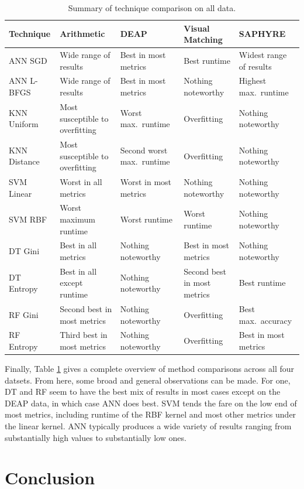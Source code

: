 \documentclass[12pt]{uthesis-v12}  %
\begin{document}
\begin{table}[!t]
\caption{Summary of technique comparison on all data.}
\renewcommand{\arraystretch}{1.3}
\centering
\resizebox{\textwidth}{!}
{\begin{tabular}{*{5}{l}}
\toprule
Technique & Arithmetic & DEAP & Visual Matching & SAPHYRE \\ \midrule
ANN SGD & Wide range of results & Best in most metrics & Best runtime & Widest range of results \\
ANN L-BFGS & Wide range of results & Best in most metrics & Nothing noteworthy & Highest max.~runtime \\
KNN Uniform & Most susceptible to overfitting & Worst max.~runtime & Overfitting & Nothing noteworthy \\
KNN Distance & Most susceptible to overfitting & Second worst max.~runtime & Overfitting & Nothing noteworthy \\
SVM Linear & Worst in all metrics & Worst in most metrics & Nothing noteworthy & Nothing noteworthy \\
SVM RBF & Worst maximum runtime & Worst runtime & Worst runtime & Nothing noteworthy \\
DT Gini & Best in all metrics & Nothing noteworthy & Best in most metrics & Nothing noteworthy \\
DT Entropy & Best in all except runtime & Nothing noteworthy & Second best in most metrics & Best runtime \\
RF Gini & Second best in most metrics & Nothing noteworthy & Overfitting & Best max.~accuracy \\
RF Entropy & Third best in most metrics & Nothing noteworthy & Overfitting & Best in most metrics \\ \bottomrule
\end{tabular}}

\label{compare-all}
\end{table}

Finally, Table \ref{compare-all} gives a complete overview of method comparisons across all four datsets. From here, some broad and general observations can be made. For one, DT and RF seem to have the best mix of results in most cases except on the DEAP data, in which case ANN does best. SVM tends the fare on the low end of most metrics, including runtime of the RBF kernel and most other metrics under the linear kernel. ANN typically produces a wide variety of results ranging from substantially high values to substantially low ones.

\section{Conclusion}
\end{document}
